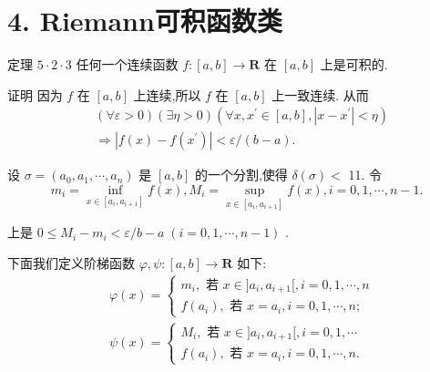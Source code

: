 \section*{4. Riemann可积函数类}

定理 $5 \cdot  2 \cdot  3$ 任何一个连续函数 $f : \left\lbrack  {a,b}\right\rbrack   \rightarrow  \mathbf{R}$ 在 $\left\lbrack  {a,b}\right\rbrack$ 上是可积的.

证明 因为 $f$ 在 $\left\lbrack  {a,b}\right\rbrack$ 上连续,所以 $f$ 在 $\left\lbrack  {a,b}\right\rbrack$ 上一致连续. 从而
\begin{align*}
	&\left( {\forall \varepsilon  > 0}\right) \left( {\exists \eta  > 0}\right) \left( {\forall x,{x}^{\prime } \in  \left\lbrack  {a,b}\right\rbrack  ,\left| {x - {x}^{\prime }}\right|  < \eta }\right)\\
	&\Rightarrow  \left| {f\left( x\right)  - f\left( {x}^{\prime }\right) }\right|  < \varepsilon /\left( {b - a}\right) .
\end{align*}

设 $\sigma  = \left( {{a}_{0},{a}_{1},\cdots ,{a}_{n}}\right)$ 是 $\left\lbrack  {a,b}\right\rbrack$ 的一个分割,使得 $\delta \left( \sigma \right)  <$ 11. 令
$${m}_{i} = \mathop{\inf }\limits_{{x \in  \left\lbrack  {{a}_{i},{a}_{i + 1}}\right\rbrack  }}f\left( x\right) ,{M}_{i} = \mathop{\sup }\limits_{{x \in  \left\lbrack  {{a}_{i},{a}_{i + 1}}\right\rbrack  }}f\left( x\right) ,i = 0,1,\cdots ,n - 1.$$

上是 $0 \leq  {M}_{i} - {m}_{i} < \varepsilon /b - a\;\left( {i = 0,1,\cdots ,n - 1}\right)$ .

下面我们定义阶梯函数 $\varphi ,\psi  : \left\lbrack  {a,b}\right\rbrack   \rightarrow  \mathbf{R}$ 如下:
\begin{align*}
	&\varphi \left( x\right)  = \left\{  \begin{array}{l} {m}_{i},\text{ 若 }x \in  \rbrack {a}_{i},{a}_{i + 1}\lbrack ,i = 0,1,\cdots ,n \\  f\left( {a}_{i}\right) ,\text{ 若 }x = {a}_{i},i = 0,1,\cdots ,n; \end{array}\right.\\
	&\psi \left( x\right)  = \left\{  \begin{array}{l} {M}_{i},\text{ 若 }x \in  \rbrack {a}_{i},{a}_{i + 1}\lbrack ,i = 0,1,\cdots \\  f\left( {a}_{i}\right) ,\text{ 若 }x = {a}_{i},i = 0,1,\cdots ,n. \end{array}\right.
\end{align*}

